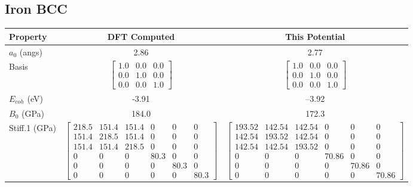 
\clearpage
\FloatBarrier
\subsection{Iron BCC}


\begin{table}[ht]
\renewcommand{\arraystretch}{1.2}
\begin{tabular}{lcccccc}
\hline\hline
Property & \multicolumn{3}{c}{DFT Computed} & \multicolumn{3}{c}{This Potential} \\
\hline\hline
$a_0$ (angs)         & \multicolumn{3}{c}{2.86}   & \multicolumn{3}{c}{2.77} \\
Basis            & \multicolumn{3}{c}{$\begin{bmatrix} 1.0 & 0.0 & 0.0 \\ 0.0 & 1.0 & 0.0 \\ 0.0 & 0.0 & 1.0  \end{bmatrix}$} & \multicolumn{3}{c}{$\begin{bmatrix} 1.0 & 0.0 & 0.0 \\ 0.0 & 1.0 & 0.0 \\ 0.0 & 0.0 & 1.0  \end{bmatrix}$} \\
$E_{coh}$ (eV)           & \multicolumn{3}{c}{-3.91}  & \multicolumn{3}{c}{--3.92} \\
$B_0$ (GPa)              & \multicolumn{3}{c}{184.0}  & \multicolumn{3}{c}{172.3} \\
Stiff.1 (GPa) & \multicolumn{3}{c}{$\begin{bmatrix} 218.5 & 151.4 & 151.4 & 0 & 0 & 0 \\ 151.4 & 218.5 & 151.4 & 0 & 0 & 0 \\ 151.4 & 151.4 & 218.5 & 0 & 0 & 0 \\ 0 & 0 & 0 & 80.3 & 0 & 0 \\ 0 & 0 & 0 & 0 & 80.3 & 0 \\ 0 & 0 & 0 & 0 & 0 & 80.3 \end{bmatrix}$}   & \multicolumn{3}{c}{$\begin{bmatrix} 193.52 & 142.54 & 142.54 & 0 & 0 & 0 \\ 142.54 & 193.52 & 142.54 & 0 & 0 & 0 \\ 142.54 & 142.54 & 193.52 & 0 & 0 & 0 \\ 0 & 0 & 0 & 70.86 & 0 & 0 \\ 0 & 0 & 0 & 0 & 70.86 & 0 \\ 0 & 0 & 0 & 0 & 0 & 70.86 \end{bmatrix}$} \\

\end{tabular}
\end{table}
